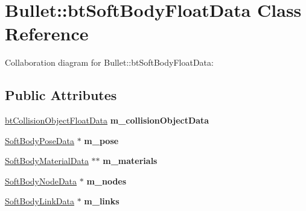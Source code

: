 \hypertarget{class_bullet_1_1bt_soft_body_float_data}{\section{Bullet\+:\+:bt\+Soft\+Body\+Float\+Data Class Reference}
\label{class_bullet_1_1bt_soft_body_float_data}
}


Collaboration diagram for Bullet\+:\+:bt\+Soft\+Body\+Float\+Data\+:
\subsection*{Public Attributes}
\begin{DoxyCompactItemize}
\item 
\hypertarget{class_bullet_1_1bt_soft_body_float_data_a649fc832f878dcf872c84d8b8e2c9e70}{\hyperlink{class_bullet_1_1bt_collision_object_float_data}{bt\+Collision\+Object\+Float\+Data} {\bfseries m\+\_\+collision\+Object\+Data}}\label{class_bullet_1_1bt_soft_body_float_data_a649fc832f878dcf872c84d8b8e2c9e70}

\item 
\hypertarget{class_bullet_1_1bt_soft_body_float_data_aff7d573ac0844532b9b9a96028127d80}{\hyperlink{class_bullet_1_1_soft_body_pose_data}{Soft\+Body\+Pose\+Data} $\ast$ {\bfseries m\+\_\+pose}}\label{class_bullet_1_1bt_soft_body_float_data_aff7d573ac0844532b9b9a96028127d80}

\item 
\hypertarget{class_bullet_1_1bt_soft_body_float_data_ad99e40d0c58b3d3b7b17d26a80edff1b}{\hyperlink{class_bullet_1_1_soft_body_material_data}{Soft\+Body\+Material\+Data} $\ast$$\ast$ {\bfseries m\+\_\+materials}}\label{class_bullet_1_1bt_soft_body_float_data_ad99e40d0c58b3d3b7b17d26a80edff1b}

\item 
\hypertarget{class_bullet_1_1bt_soft_body_float_data_aa8b58a73bcb179bd8be82f5a7a8ce53a}{\hyperlink{class_bullet_1_1_soft_body_node_data}{Soft\+Body\+Node\+Data} $\ast$ {\bfseries m\+\_\+nodes}}\label{class_bullet_1_1bt_soft_body_float_data_aa8b58a73bcb179bd8be82f5a7a8ce53a}

\item 
\hypertarget{class_bullet_1_1bt_soft_body_float_data_aced476cf1f124d5e6ad21c523ffa3a0c}{\hyperlink{class_bullet_1_1_soft_body_link_data}{Soft\+Body\+Link\+Data} $\ast$ {\bfseries m\+\_\+links}}\label{class_bullet_1_1bt_soft_body_float_data_aced476cf1f124d5e6ad21c523ffa3a0c}


\end{DoxyCompactItemize}

